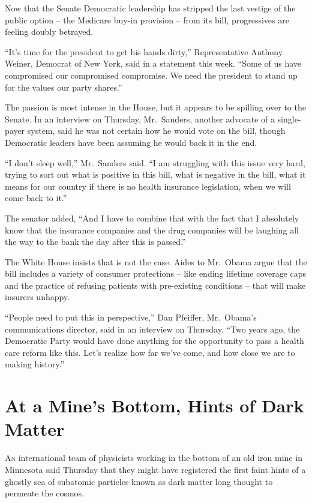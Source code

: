 ﻿\documentclass[12pt]{article}
\begin{document}
Now that the Senate Democratic leadership has stripped the last vestige of the public option -- the
Medicare buy-in provision -- from its bill, progressives are feeling doubly betrayed.

``It's time for the president to get his hands dirty,'' Representative Anthony Weiner, Democrat of
New York, said in a statement this week. ``Some of us have compromised our compromised compromise.
We need the president to stand up for the values our party shares.''

The passion is most intense in the House, but it appears to be spilling over to the Senate. In an
interview on Thursday, Mr.~Sanders, another advocate of a single-payer system, said he was not
certain how he would vote on the bill, though Democratic leaders have been assuming he would back it
in the end.

``I don't sleep well,'' Mr.~Sanders said. ``I am struggling with this issue very hard, trying to
sort out what is positive in this bill, what is negative in the bill, what it means for our country
if there is no health insurance legislation, when we will come back to it.''

The senator added, ``And I have to combine that with the fact that I absolutely know that the
insurance companies and the drug companies will be laughing all the way to the bank the day after
this is passed.''

The White House insists that is not the case. Aides to Mr.~Obama argue that the bill includes a
variety of consumer protections -- like ending lifetime coverage caps and the practice of refusing
patients with pre-existing conditions -- that will make insurers unhappy.

``People need to put this in perspective,'' Dan Pfeiffer, Mr.~Obama's communications director, said
in an interview on Thursday. ``Two years ago, the Democratic Party would have done anything for the
opportunity to pass a health care reform like this. Let's realize how far we've come, and how close
we are to making history.''

\section{At a Mine's Bottom, Hints of Dark Matter}

\lettrine{A}{n} international team of physicists working in the bottom of an
old iron mine in Minnesota said Thursday that they might have registered the first faint hints of a
ghostly sea of subatomic particles known as dark matter long thought to permeate the cosmos.
\end{document}
